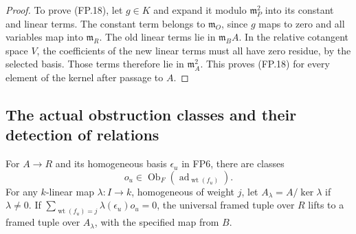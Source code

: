 \begin{proof}
To prove (FP.18), let $g\in K$ and expand it modulo
$\mathfrak m_P^2$ into its constant and linear terms.
The constant term belongs to $\mathfrak m_O$, since $g$ maps to
zero and all variables map into $\mathfrak m_R$.
The old linear terms lie in $\mathfrak m_BA$.
In the relative cotangent space $V$, the coefficients of the new
linear terms must all have zero residue, by the selected basis.
Those terms therefore lie in $\mathfrak m_A^2$.
This proves (FP.18) for every element of the kernel after passage
to $A$.
\end{proof}

\subsection{The actual obstruction classes and their detection of relations}

\begin{proposition}
\label{claim:FP7}
For $A\to R$ and its homogeneous basis $\epsilon_u$ in FP6, there
are classes
\[
        o_u\in\operatorname{Ob}_F
                      (\operatorname{ad}_{\operatorname{wt}(f_u)}).
 \tag{FP.21}
\]
For any $k$-linear map $\lambda:I\to k$, homogeneous of weight $j$,
let $A_\lambda=A/\ker\lambda$ if $\lambda\ne0$.
If $\sum_{\operatorname{wt}(f_u)=j}\lambda(\epsilon_u)o_u=0$,
the universal framed tuple over $R$ lifts to a framed tuple over
$A_\lambda$, with the specified map from $B$.
\end{proposition}

